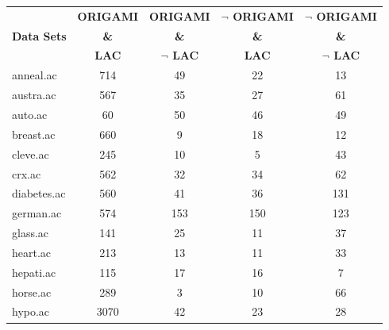 \begin{table}[htbp]
	\centering
		\begin{tabular}{|l|c|c|c|c|}
		\hline
				& \textbf{ORIGAMI}	& \textbf{ORIGAMI}		& \textbf{$\neg$ ORIGAMI}	& \textbf{$\neg$ ORIGAMI}	\\
		\textbf{Data Sets}	& \textbf{\&}		& \textbf{\&}			& \textbf{\&}			& \textbf{\&}			\\
				&  \textbf{LAC}		& \textbf{$\neg$ LAC}		& \textbf{LAC}			& \textbf{$\neg$ LAC}		\\
		\hline
		anneal.ac       & 714           & 49                 & 22                       & 13                            \\
		\hline
		austra.ac       & 567           & 35                 & 27                       & 61                            \\
		\hline
		auto.ac         & 60            & 50                 & 46                       & 49                            \\
		\hline
		breast.ac       & 660           & 9                  & 18                       & 12                            \\
		\hline
		cleve.ac        & 245           & 10                 & 5                        & 43                            \\
		\hline
		crx.ac          & 562           & 32                 & 34                       & 62                            \\
		\hline
		diabetes.ac     & 560           & 41                 & 36                       & 131                           \\
		\hline
		german.ac       & 574           & 153                & 150                      & 123                           \\
		\hline
		glass.ac        & 141           & 25                 & 11                       & 37                            \\
		\hline
		heart.ac        & 213           & 13                 & 11                       & 33                            \\
		\hline
		hepati.ac       & 115           & 17                 & 16                       & 7                             \\
		\hline
		horse.ac        & 289           & 3                  & 10                       & 66                            \\
		\hline
		hypo.ac         & 3070          & 42                 & 23                       & 28                            \\

\end{tabular}
\end{table}

